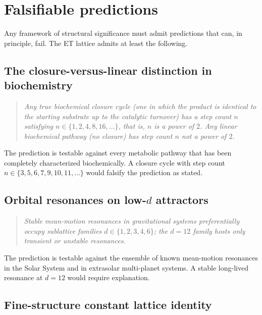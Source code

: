 \documentclass[11pt,a4paper]{article}
\theoremstyle{definition}
\theoremstyle{remark}
\begin{document}
\section{Falsifiable predictions}\label{sec:predictions}

Any framework of structural significance must admit predictions that can, in principle, fail. The ET lattice admits at least the following.

\subsection{The closure-versus-linear distinction in biochemistry}

\begin{quote}\itshape
Any true biochemical closure cycle (one in which the product is identical to the starting substrate up to the catalytic turnover) has a step count $n$ satisfying $n\in\{1,2,4,8,16,\ldots\}$, that is, $n$ is a power of $2$. Any linear biochemical pathway (no closure) has step count $n$ not a power of $2$.
\end{quote}

The prediction is testable against every metabolic pathway that has been completely characterized biochemically. A closure cycle with step count $n\in\{3,5,6,7,9,10,11,\ldots\}$ would falsify the prediction as stated.

\subsection{Orbital resonances on low-$d$ attractors}

\begin{quote}\itshape
Stable mean-motion resonances in gravitational systems preferentially occupy sublattice families $d\in\{1,2,3,4,6\}$; the $d=12$ family hosts only transient or unstable resonances.
\end{quote}

The prediction is testable against the ensemble of known mean-motion resonances in the Solar System and in extrasolar multi-planet systems. A stable long-lived resonance at $d=12$ would require explanation.

\subsection{Fine-structure constant lattice identity}
\end{document}
